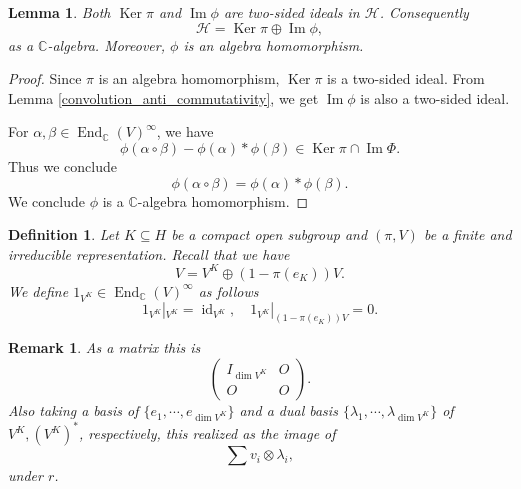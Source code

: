 \documentclass[8pt]{article}
\newtheorem{definition}{Definition}[section]
\newtheorem{lemma}{Lemma}[section]
\newtheorem{remark}{Remark}[section]
\DeclareMathOperator{\End}{End}
\DeclareMathOperator{\Image}{Im}
\DeclareMathOperator{\Ker}{Ker}
\DeclareMathOperator{\id}{id}
\newcommand{\C}[0]{\mathbb{C}}
\newcommand{\hecke}[0]{\mathscr{H}}
\begin{document}
\begin{lemma}
  Both $\Ker\pi$ and $\Image\phi$ are two-sided ideals in $\hecke$. Consequently 
  \begin{equation*}
    \hecke = \Ker\pi\oplus\Image\phi,
  \end{equation*}
  as a $\C$-algebra. Moreover, $\phi$ is an algebra homomorphism.
\end{lemma}
\begin{proof}
  Since $\pi$ is an algebra homomorphism, $\Ker\pi$ is a two-sided ideal. From Lemma \ref{convolution_anti_commutativity}, we get $\Image\phi$ is also a two-sided ideal. 
  \par For $\alpha,\beta\in\End_\C(V)^\infty$, we have 
  \begin{equation*}
    \phi(\alpha\circ\beta)-\phi(\alpha)\ast\phi(\beta)\in\Ker\pi\cap\Image\Phi.
  \end{equation*}
  Thus we conclude 
  \begin{equation*}
    \phi(\alpha\circ\beta)=\phi(\alpha)\ast\phi(\beta).
  \end{equation*}
  We conclude $\phi$ is a $\C$-algebra homomorphism.
\end{proof}

\begin{definition}
  Let $K\subseteq H$ be a compact open subgroup and $(\pi,V)$ be a finite and irreducible representation. Recall that we have 
  \begin{equation*}
  V = V^K\oplus(1-\pi(e_K))V.
  \end{equation*}
  We define $1_{V^K}\in\End_\C(V)^\infty$ as follows 
  \begin{equation*}
    1_{V^K}|_{V^K} = \id_{V^K},\quad 1_{V^K}|_{(1-\pi(e_K))V} = 0.
  \end{equation*}
\end{definition}

\begin{remark}
  As a matrix this is 
  \begin{equation*}
    \begin{pmatrix}
      I_{\dim V^K}&O\\
      O&O
    \end{pmatrix}.
  \end{equation*}
  Also taking a basis of $\{e_1,\cdots,e_{\dim V^K}\}$ and a dual basis $\{\lambda_1,\cdots,\lambda_{\dim V^K}\}$ of $V^K,(V^K)^*$, respectively, this realized as the image of 
  \begin{equation*}
    \sum v_i\otimes \lambda_i,
  \end{equation*}
  under $r$.
  \label{remark_thought_e_K}
\end{remark}
\end{document}
